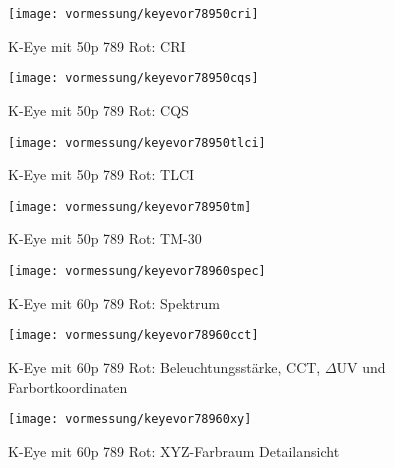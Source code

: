 \documentclass[pagesize,paper=A4,fontsize=12pt,utf8,numbers=noenddot,bibliography=totoc,listof=totoc,DIV=11,BCOR=1mm]{scrreprt}
\begin{document}
\begin{figure}[htp]     %
\centering
\texttt{[image: vormessung/keyevor78950cri]} 
\caption {K-Eye mit 50p 789 Rot: CRI} 
\end{figure}

\begin{figure}[htp]     %
\centering
\texttt{[image: vormessung/keyevor78950cqs]} 
\caption {K-Eye mit 50p 789 Rot: CQS} 
\end{figure}

\begin{figure}[htp]     %
\centering
\texttt{[image: vormessung/keyevor78950tlci]} 
\caption {K-Eye mit 50p 789 Rot: TLCI} 
\end{figure}

\begin{figure}[htp]     %
\centering
\texttt{[image: vormessung/keyevor78950tm]} 
\caption {K-Eye mit 50p 789 Rot: TM-30} 
\end{figure}




\begin{figure}[htp]     %
\centering
\texttt{[image: vormessung/keyevor78960spec]} 
\caption {K-Eye mit 60p 789 Rot: Spektrum} 
\end{figure}

\begin{figure}[htp]     %
\centering
\texttt{[image: vormessung/keyevor78960cct]} 
\caption {K-Eye mit 60p 789 Rot: Beleuchtungsstärke, CCT, $\Delta$UV und Farbortkoordinaten} 
\end{figure}

\begin{figure}[htp]     %
\centering
\texttt{[image: vormessung/keyevor78960xy]} 
\caption {K-Eye mit 60p 789 Rot: XYZ-Farbraum Detailansicht} 
\end{figure}
\end{document}
